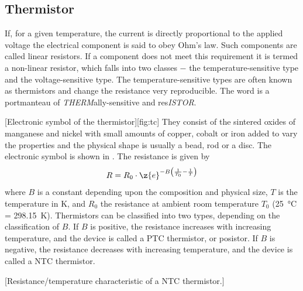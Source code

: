 \subsection{Thermistor}\label{sec:therm}
If, for a given temperature, the current is directly proportional to the applied voltage the electrical component is said to obey Ohm's law. Such components are called linear resistors. If a component does not meet this requirement it is termed a non-linear resistor, which falls into two classes $-$ the temperature-sensitive type and the voltage-sensitive type. The temperature-sensitive types are often known as thermistors and change the resistance very reproducible. The word is a portmanteau of \textit{THERM}ally-sensitive and res\textit{ISTOR}.\par
{}[Electronic symbol of the thermistor][fig:tc]
They consist of the sintered oxides of manganese and nickel with small amounts of copper, cobalt or iron added to vary the properties and the physical shape is usually a bead, rod or a disc. The electronic symbol is shown in . The resistance is given by
\begin{equation}
	R = R_{0}\cdot\z{e}^{-B\left(\frac{1}{T_{0}} - \frac{1}{T}\right)}\label{eq:th}
\end{equation}
where $B$ is a constant depending upon the composition and physical size, $T$ is the temperature in \deg K, and $R_{0}$ the resistance at ambient room temperature $T_{0}$ (\SI{25}{\degreeCelsius} = \SI{298.15}{\kelvin}). Thermistors can be classified into two types, depending on the classification of $B$. If $B$ is positive, the resistance increases with increasing temperature, and the device is called a \ac{PTC} thermistor, or posistor. If $B$ is negative, the resistance decreases with increasing temperature, and the device is called a \ac{NTC} thermistor.

[Resistance/temperature characteristic of a \ac{NTC} thermistor.]

